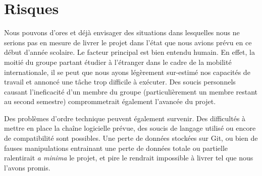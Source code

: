 \chapter{Risques}
	Nous pouvons d'ores et déjà envisager des situations dans lesquelles nous ne serions pas en mesure de livrer le projet dans l'état que nous avions prévu en ce début d'année scolaire.
	Le facteur principal est bien entendu humain. En effet, la moitié du groupe partant étudier à l'étranger dans le cadre de la mobilité internationale, il se peut que nous ayons légèrement sur-estimé nos capacités de travail et annoncé une tâche trop difficile à exécuter. Des soucis personnels causant l'ineficacité d'un membre du groupe (particulièrement un membre restant au second semestre) comprommetrait également l'avancée du projet.

	Des problèmes d'ordre technique peuvent également survenir. Des difficultés à mettre en place la chaîne logicielle prévue, des soucis de langage utilisé ou encore de compatibilité sont possibles.
	Une perte de données stockées sur Git, ou bien de fauses manipulations entrainant une perte de données totale ou partielle ralentirait \textit{a minima} le projet, et pire le rendrait impossible à livrer tel que nous l'avons promis.